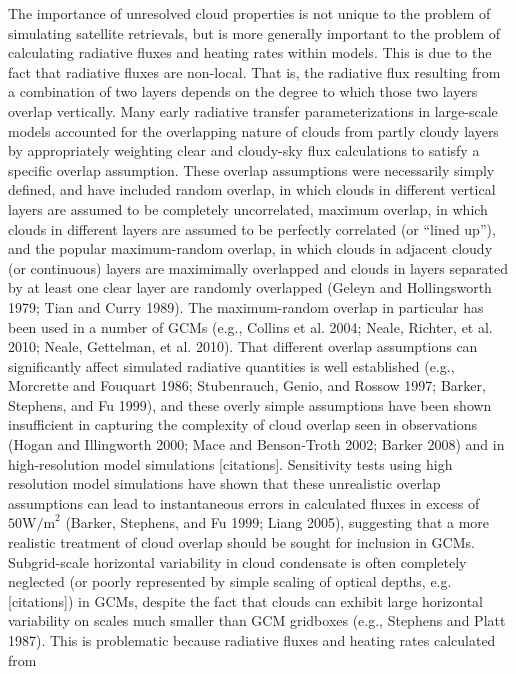 The importance of unresolved cloud properties is not unique to the
problem of simulating satellite retrievals, but is more generally
important to the problem of calculating radiative fluxes and heating
rates within models. This is due to the fact that radiative fluxes are
non-local. That is, the radiative flux resulting from a combination of
two layers depends on the degree to which those two layers overlap
vertically. Many early radiative transfer parameterizations in
large-scale models accounted for the overlapping nature of clouds from
partly cloudy layers by appropriately weighting clear and cloudy-sky
flux calculations to satisfy a specific overlap assumption. These
overlap assumptions were necessarily simply defined, and have included
random overlap, in which clouds in different vertical layers are assumed
to be completely uncorrelated, maximum overlap, in which clouds in
different layers are assumed to be perfectly correlated (or ``lined
up''), and the popular maximum-random overlap, in which clouds in
adjacent cloudy (or continuous) layers are maximimally overlapped and
clouds in layers separated by at least one clear layer are randomly
overlapped (Geleyn and Hollingsworth 1979; Tian and Curry 1989). The
maximum-random overlap in particular has been used in a number of GCMs
(e.g., Collins et al. 2004; Neale, Richter, et al. 2010; Neale,
Gettelman, et al. 2010). That different overlap assumptions can
significantly affect simulated radiative quantities is well established
(e.g., Morcrette and Fouquart 1986; Stubenrauch, Genio, and Rossow 1997;
Barker, Stephens, and Fu 1999), and these overly simple assumptions have
been shown insufficient in capturing the complexity of cloud overlap
seen in observations (Hogan and Illingworth 2000; Mace and Benson-Troth
2002; Barker 2008) and in high-resolution model simulations
{[}citations{]}. Sensitivity tests using high resolution model
simulations have shown that these unrealistic overlap assumptions can
lead to instantaneous errors in calculated fluxes in excess of
\(50 \textrm{W/m}^2\) (Barker, Stephens, and Fu 1999; Liang 2005),
suggesting that a more realistic treatment of cloud overlap should be
sought for inclusion in GCMs. Subgrid-scale horizontal variability in
cloud condensate is often completely neglected (or poorly represented by
simple scaling of optical depths, e.g. {[}citations{]}) in GCMs, despite
the fact that clouds can exhibit large horizontal variability on scales
much smaller than GCM gridboxes (e.g., Stephens and Platt 1987). This is
problematic because radiative fluxes and heating rates calculated from
